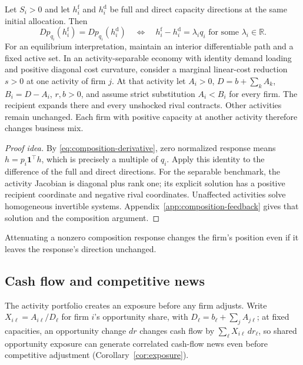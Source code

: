 \begin{proposition}\label{prop:composition-feedback}
  Let $S_i>0$ and let $h_i^{\mathrm f}$ and $h_i^{\mathrm d}$ be full and
  direct capacity directions at the same initial allocation.
  Then
  \begin{equation}\label{eq:proportional-feedback}
    Dp_{q_i}(h_i^{\mathrm f})=Dp_{q_i}(h_i^{\mathrm d})
    \quad\Longleftrightarrow\quad
    h_i^{\mathrm f}-h_i^{\mathrm d}=\lambda_i q_i
    \text{ for some }\lambda_i\in\mathbb R.
  \end{equation}
  For an equilibrium interpretation, maintain an interior differentiable path
  and a fixed active set.
  In an activity-separable economy with identity demand loading and positive
  diagonal cost curvature, consider a marginal linear-cost reduction $s>0$ at
  one activity of firm $j$.
  At that activity let $A_i>0$, $D=b+\sum_k A_k$, $B_i=D-A_i$, $r,b>0$, and
  assume strict substitution $A_i<B_i$ for every firm.
  The recipient expands there and every unshocked rival contracts.
  Other activities remain unchanged.
  Each firm with positive capacity at another activity therefore
  changes business mix.
\end{proposition}

\begin{proof}[Proof idea]
  By \eqref{eq:composition-derivative}, zero normalized response means
  $h=p_i\mathbf1^\top h$, which is precisely a multiple of $q_i$.
  Apply this identity to the difference of the full and direct directions.
  For the separable benchmark, the activity Jacobian is diagonal plus rank
  one; its explicit solution has a positive recipient coordinate and negative
  rival coordinates.
  Unaffected activities solve homogeneous invertible systems.
  Appendix~\ref{app:composition-feedback} gives that solution and the
  composition argument.
\end{proof}

Attenuating a nonzero composition response changes the firm's
position even if it leaves the response's direction unchanged.

\subsection{Cash flow and competitive news}\label{sec:model-cash-flow}

The activity portfolio creates an exposure before any firm adjusts.
Write $X_{i\ell}=A_{i\ell}/D_\ell$ for firm $i$'s opportunity share, with
$D_\ell=b_\ell+\sum_j A_{j\ell}$; at fixed capacities, an opportunity change
$dr$ changes cash flow by $\sum_\ell X_{i\ell}\,dr_\ell$, so shared
opportunity exposure can generate correlated cash-flow news even before
competitive adjustment (Corollary~\ref{cor:exposure}).


